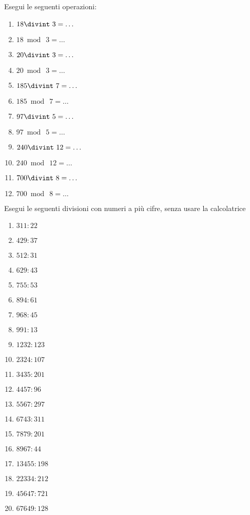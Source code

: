 \begin{esercizio}
 Esegui le seguenti operazioni:
\begin{multicols}{3}
 \begin{enumerate}[noitemsep, label=(\alph*)]
 \item \(18\divint~3=\ldots\)
 \item \(18\bmod~3=\ldots\)
 \item \(20\divint~3=\ldots\)
 \item \(20\bmod~3=\ldots\)
 \item \(185\divint~7=\ldots\)
 \item \(185\bmod~7=\ldots\)
 \item \(97\divint~5=\ldots\)
 \item \(97\bmod~5=\ldots\)
 \item \(240\divint~12=\ldots\)
 \item \(240\bmod~12=\ldots\)
 \item \(700\divint~8=\ldots\)
 \item \(700\bmod~8=\ldots\)
 \end{enumerate}
\end{multicols}
\end{esercizio}


\begin{esercizio}
 Esegui le seguenti divisioni con numeri a più cifre, senza usare la 
calcolatrice
\begin{multicols}{4}
 \begin{enumerate}[noitemsep, label=(\alph*)]
 \item \(311:22\)
 \item \(429:37\)
 \item \(512:31\)
 \item \(629:43\)
 \item \(755:53\)
 \item \(894:61\)
 \item \(968:45\)
 \item \(991:13\)
 \item \(1232:123\)
 \item \(2324:107\)
 \item \(3435:201\)
 \item \(4457:96\)
 \item \(5567:297\)
 \item \(6743:311\)
 \item \(7879:201\)
 \item \(8967:44\)
 \item \(13455:198\)
 \item \(22334:212\)
 \item \(45647:721\)
 \item \(67649:128\)
 \end{enumerate}
\end{multicols}
\end{esercizio}

